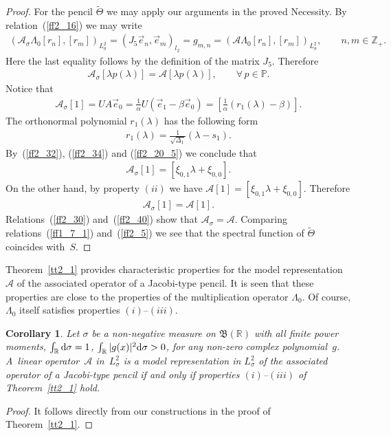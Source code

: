 \documentclass[pdftex]{sigma}
\numberwithin{equation}{section}
\newtheorem{Corollary}[Theorem]{Corollary}
\begin{document}
\begin{proof}
For the pencil $\widetilde\Theta$ we may apply our arguments in the proved Necessity. By relation~(\ref{ff2_16}) we may write
\begin{gather*} (\mathcal{A}_\sigma \Lambda_0 [r_n],[r_m])_{L^2_\sigma} = (J_5 \vec e_n, \vec e_m)_{l_2} = g_{m,n} = (\mathcal{A} \Lambda_0 [r_n],[r_m])_{L^2_\sigma},\qquad n,m\in\mathbb{Z}_+. \end{gather*}
Here the last equality follows by the def\/inition of the matrix $J_5$. Therefore
\begin{gather}\label{ff2_30}
\mathcal{A}_\sigma [ \lambda p(\lambda) ] = \mathcal{A} [ \lambda p(\lambda) ],\qquad \forall\, p\in\mathbb{P}.
\end{gather}
Notice that
\begin{gather}\label{ff2_32}
\mathcal{A}_\sigma [ 1 ] = U A \vec e_0 =\frac{1}{\alpha} U (\vec e_1 - \beta \vec e_0)=\left[ \frac{1}{\alpha} (r_1(\lambda) - \beta) \right].
\end{gather}
The orthonormal polynomial $r_1(\lambda)$ has the following form
\begin{gather}\label{ff2_34}
r_1(\lambda) = \frac{1}{\sqrt{\Delta_1}} (\lambda - s_1).
\end{gather}
By~(\ref{ff2_32}), (\ref{ff2_34}) and (\ref{ff2_20_5}) we conclude that
\begin{gather*} \mathcal{A}_\sigma [ 1 ] = [ \xi_{0,1} \lambda + \xi_{0,0} ]. \end{gather*}
On the other hand, by property $(ii)$ we have $\mathcal{A} [ 1 ] = [ \xi_{0,1} \lambda + \xi_{0,0} ]$. Therefore
\begin{gather}\label{ff2_40}
\mathcal{A}_\sigma [ 1 ] = \mathcal{A} [ 1 ].
\end{gather}
Relations~(\ref{ff2_30}) and~(\ref{ff2_40}) show that $\mathcal{A}_\sigma = \mathcal{A}$. Comparing relations~(\ref{ff1_7_1}) and~(\ref{ff2_5}) we see that the spectral function of $\widetilde\Theta$ coincides with~$S$.
\end{proof}

Theorem~\ref{tt2_1} provides characteristic properties for the model representation $\mathcal{A}$ of the asso\-ciated operator of a Jacobi-type pencil. It is seen that these properties are close to the properties of the multiplication operator $\Lambda_0$. Of course, $\Lambda_0$ itself satisf\/ies properties $(i)$--$(iii)$.

\begin{Corollary}\label{cc2_1} Let $\sigma$ be a non-negative measure on $\mathfrak{B}(\mathbb{R})$ with all finite power moments, $\int_\mathbb{R} {\rm d}\sigma = 1$, $\int_\mathbb{R} |g(x)|^2 {\rm d}\sigma > 0$, for any non-zero complex polynomial~$g$. A~linear operator~$\mathcal{A}$ in~$L^2_\sigma$ is a model representation in $L^2_\sigma$ of the associated operator of a Jacobi-type pencil if and only if properties $(i)$--$(iii)$ of Theorem~{\rm \ref{tt2_1}} hold.
\end{Corollary}
\begin{proof} It follows directly from our constructions in the proof of Theorem~\ref{tt2_1}.
\end{proof}
\end{document}
